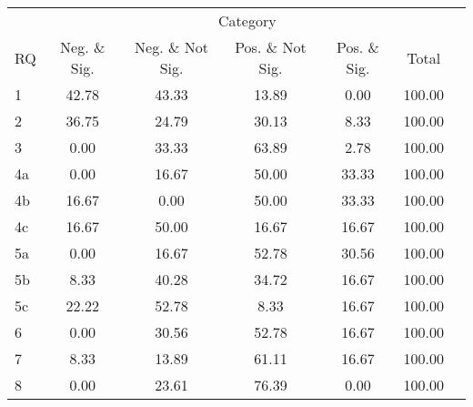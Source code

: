 \begin{tabular}{lcccccc}
\hline
\hline
 & \multicolumn{5}{c}{Category} \\
RQ&Neg. \& Sig.&Neg. \& Not Sig.&Pos. \& Not Sig.&Pos. \& Sig.&Total \\
%
\hline
1&42.78&43.33&13.89&0.00&100.00 \\
2&36.75&24.79&30.13&8.33&100.00 \\
3&0.00&33.33&63.89&2.78&100.00 \\
4a&0.00&16.67&50.00&33.33&100.00 \\
4b&16.67&0.00&50.00&33.33&100.00 \\
4c&16.67&50.00&16.67&16.67&100.00 \\
5a&0.00&16.67&52.78&30.56&100.00 \\
5b&8.33&40.28&34.72&16.67&100.00 \\
5c&22.22&52.78&8.33&16.67&100.00 \\
6&0.00&30.56&52.78&16.67&100.00 \\
7&8.33&13.89&61.11&16.67&100.00 \\
8&0.00&23.61&76.39&0.00&100.00 \\
\hline
\hline
\end{tabular}
